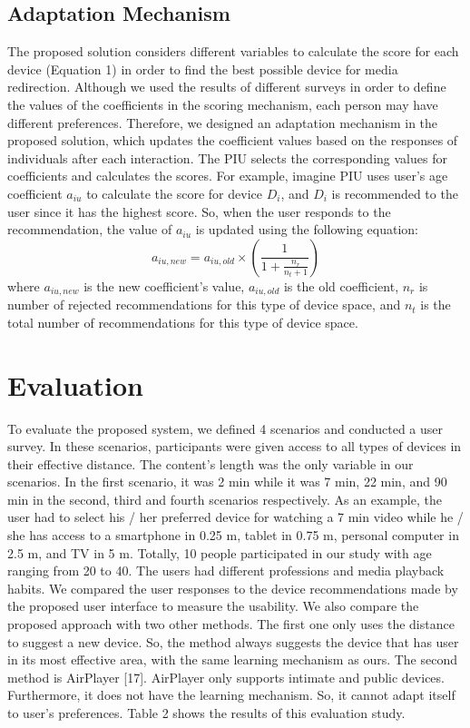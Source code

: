 \documentclass{article}
\begin{document}
\subsection{Adaptation Mechanism}The proposed solution considers different variables to calculate the score for each device (Equation 1) in order to find the best possible device for media redirection. Although we used the results of different surveys in order to define the values of the coefficients in the scoring mechanism, each person may have different preferences. Therefore, we designed an adaptation mechanism in the proposed solution, which updates the coefficient values based on the responses of individuals after each interaction. The PIU selects the corresponding values for coefficients and calculates the scores. For example, imagine PIU uses user's age coefficient $a_{iu}$ to calculate the score for device $D_i$, and $D_i$ is recommended to the user since it has the highest score. So, when the user responds to the recommendation, the value of $a_{iu}$ is updated using the following equation:
\begin{equation}
             a_{iu,new} = a_{iu,old} \times ( \frac{1}{1+ \frac{n_r}{n_t+1}})
         \end{equation}
where $a_{iu,new}$ is the new coefficient's value, $a_{iu,old}$ is the old coefficient, $n_r$ is number of rejected recommendations for this type of device space, and $n_t$ is the total number of recommendations for this type of device space.
\section{Evaluation}
To evaluate the proposed system, we defined 4 scenarios and conducted a user survey. In these scenarios, participants were given access to all types of devices in their effective distance. The content's length was the only variable in our scenarios. In the first scenario, it was 2 min while it was 7 min, 22 min, and 90 min in the second, third and fourth scenarios respectively. As an example, the user had to select his / her preferred device for watching a 7 min video while he / she has access to a smartphone in 0.25 m, tablet in 0.75 m, personal computer in 2.5 m, and TV in 5 m. Totally, 10 people participated in our study with age ranging from 20 to 40. The users had different professions and media playback habits. We compared the user responses to the device recommendations made
by the proposed user interface to measure the usability.
We also compare the proposed approach with two other methods. The first
one only uses the distance to suggest a new device. So, the method always suggests the device that has user in its most effective area, with the same learning mechanism as ours. The second method is AirPlayer [17]. AirPlayer only supports intimate and public devices. Furthermore, it does not have the learning mechanism. So, it cannot adapt itself to user's preferences.
Table 2 shows the results of this evaluation study.
\end{document}
